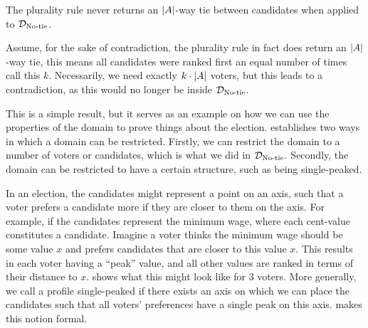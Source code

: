 \begin{proposition}
	The plurality rule never returns an $|A|$-way tie between candidates when applied to $\mathcal{D}_{\textnormal{No-tie}}$.
\end{proposition}

\begin{proofc}
	Assume, for the sake of contradiction, the plurality rule in fact does
	return an $|A|$-way tie, this means all candidates were ranked first an
	equal number of times call this $k$. Necessarily, we need
	exactly $k \cdot |A|$ voters, but this leads to a
	contradiction, as this would no longer be inside $\mathcal{D}_{\textnormal{No-tie}}$.
\end{proofc}

This is a simple result, but it serves as an example on how we can use the
properties of the domain to prove things about the election.
\citet{gaertnerDomainRestrictions2002} establishes two ways in which a domain can
be restricted. Firstly, we can restrict the domain to a number of voters or
candidates, which is what we did in $\mathcal{D}_{\textnormal{No-tie}}$. Secondly, the domain can
be restricted to have a certain structure, such as being single-peaked.


In an election, the candidates might represent a point on an axis, such that a voter
prefers a candidate more if they are closer to them on the axis. For
example, if the candidates represent the minimum wage, where each cent-value
constitutes a candidate. Imagine a voter thinks the minimum wage should  be
some value $x$ and prefers candidates that are closer to this value $x$. This
results in each voter having a ``peak'' value, and all other values are ranked
in terms of their distance to $x$.  shows what this
might look like for 3 voters. More generally, we call a profile single-peaked
if there exists an axis on which we can place the candidates such that all
voters' preferences have a single peak on this axis. 
makes this notion formal.

